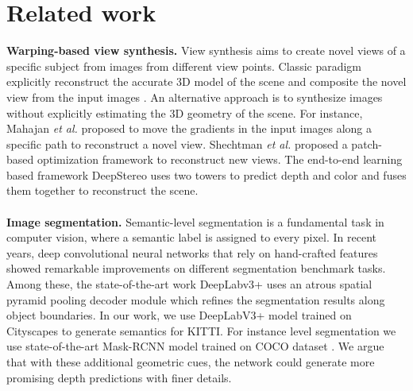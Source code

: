 \documentclass[10pt,twocolumn,letterpaper]{article}
\begin{document}
\section{Related work}
\noindent \textbf{Warping-based view synthesis.}
View synthesis aims to create novel views of a specific subject from images from different view points. Classic paradigm explicitly reconstruct the accurate 3D model of the scene and composite the novel view from the input images \cite{malik1996modeling}\cite{fitzgibbon2005image}\cite{DBLP:journals/tog/ZitnickKUWS04}. An alternative approach is to synthesize images without explicitly estimating the 3D geometry of the scene. For instance, Mahajan \textit{et al.} \cite{shechtman2010regenerative} proposed to move the gradients in the input images along a specific path to reconstruct a novel view. Shechtman \textit{et al.} \cite{shechtman2010regenerative} proposed a patch-based optimization framework to reconstruct new views. The end-to-end learning based framework DeepStereo \cite{DBLP:journals/corr/FlynnNPS15} uses two towers to predict depth and color and fuses them together to reconstruct the scene.  
\\
\noindent
\\
\textbf{Image segmentation.}
Semantic-level segmentation is a fundamental task in computer vision, where a semantic label is assigned to every pixel. In recent years, deep convolutional neural networks that rely on hand-crafted features showed remarkable improvements on different segmentation benchmark tasks. Among these, the state-of-the-art work DeepLabv3+ \cite{deeplabv3plus2018} uses an atrous spatial pyramid pooling decoder module which refines the segmentation results along object boundaries. In our work, we use DeepLabV3+ model trained on Cityscapes \cite{cordts2016cityscapes} to generate semantics for KITTI. For instance level segmentation we use state-of-the-art Mask-RCNN model \cite{he2017mask} trained on COCO dataset \cite{lin2014microsoft}. We argue that with these additional geometric cues, the network could generate more promising depth predictions with finer details.
\end{document}
